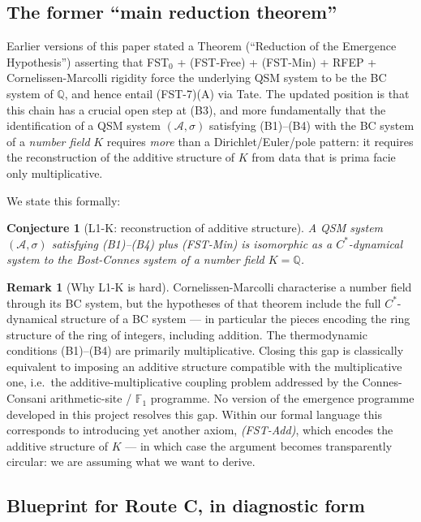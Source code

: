 \documentclass[11pt,a4paper]{article}
\theoremstyle{plain}
\newtheorem{conjecture}[theorem]{Conjecture}
\theoremstyle{definition}
\newtheorem{remark}[theorem]{Remark}
\newcommand{\Q}{\mathbb{Q}}
\newcommand{\F}{\mathbb{F}}
\begin{document}
\subsection{The former ``main reduction theorem''}
\label{sec:former-reduction}

Earlier versions of this paper stated a Theorem (``Reduction of the
Emergence Hypothesis'') asserting that FST$_0$ + (FST-Free) +
(FST-Min) + RFEP + Cornelissen-Marcolli rigidity force the
underlying QSM system to be the BC system of $\Q$, and hence entail
(FST-7)(A) via Tate.  The updated position is that this chain has a
crucial open step at (B3), and more fundamentally that the
identification of a QSM system $(\mathcal A, \sigma)$ satisfying
(B1)--(B4) with the BC system of a \emph{number field} $K$ requires
\emph{more} than a Dirichlet/Euler/pole pattern: it requires the
reconstruction of the additive structure of $K$ from data that is
prima facie only multiplicative.

We state this formally:

\begin{conjecture}[L1-K: reconstruction of additive structure]
\label{conj:l1k}
A QSM system $(\mathcal A, \sigma)$ satisfying (B1)--(B4) plus
(FST-Min) is isomorphic as a $C^\ast$-dynamical system to the
Bost-Connes system of a number field $K = \Q$.
\end{conjecture}

\begin{remark}[Why L1-K is hard]\label{rem:l1k-hard}
Cornelissen-Marcolli characterise a number field through its BC
system, but the hypotheses of that theorem include the full
$C^\ast$-dynamical structure of a BC system --- in particular the
pieces encoding the ring structure of the ring of integers,
including addition.  The thermodynamic conditions (B1)--(B4) are
primarily multiplicative.  Closing this gap is classically
equivalent to imposing an additive structure compatible with the
multiplicative one, i.e.\ the additive-multiplicative coupling
problem addressed by the Connes-Consani arithmetic-site / $\F_1$
programme.  No version of the emergence programme developed in this
project resolves this gap.  Within our formal language this
corresponds to introducing yet another axiom, \emph{(FST-Add)},
which encodes the additive structure of $K$ --- in which case the
argument becomes transparently circular: we are assuming what we
want to derive.
\end{remark}

\subsection{Blueprint for Route C, in diagnostic form}
\end{document}
